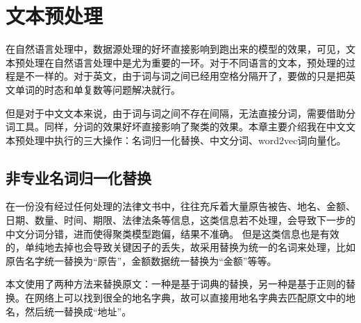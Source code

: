 \section{文本预处理}
在自然语言处理中，数据源处理的好坏直接影响到跑出来的模型的效果，可见，文本预处理在自然语言处理中是尤为重要的一环。对于不同语言的文本，预处理的过程是不一样的。对于英文，由于词与词之间已经用空格分隔开了，要做的只是把英文单词的时态和单复数等问题解决就行。

但是对于中文文本来说，由于词与词之间不存在间隔，无法直接分词，需要借助分词工具。同样，分词的效果好坏直接影响了聚类的效果。本章主要介绍我在中文文本预处理中执行的三大操作：名词归一化替换、中文分词、word2vec词向量化。

\subsection{非专业名词归一化替换}

在一份没有经过任何处理的法律文书中，往往充斥着大量原告被告、地名、金额、日期、数量、时间、期限、法律法条等信息，这类信息若不处理，会导致下一步的中文分词分错，进而使得聚类模型跑偏，结果不准确。
但是这类信息也是有效的，单纯地去掉也会导致关键因子的丢失，故采用替换为统一的名词来处理，比如原告名字统一替换为“原告”，金额数据统一替换为“金额”等等。

本文使用了两种方法来替换原文：一种是基于词典的替换，另一种是基于正则的替换。在网络上可以找到很全的地名字典，故可以直接用地名字典去匹配原文中的地名，然后统一替换成“地址”。

